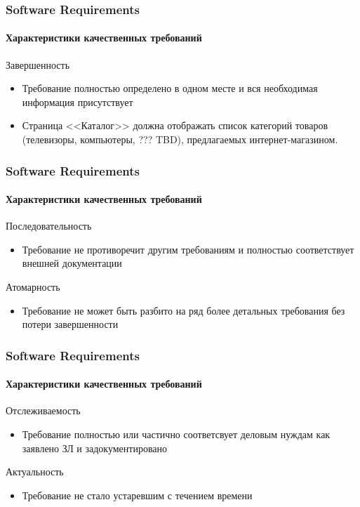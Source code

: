 \documentclass[aspectratio=169, 12pt]{beamer}
\begin{document}
\begin{frame}[t]
    \frametitle{Software Requirements}
    \framesubtitle{Характеристики качественных требований}
    Завершенность \newline
    \begin{itemize}
        \item Требование полностью определено в одном месте и вся необходимая информация присутствует \newline \pause
        \item Страница <<Каталог>> должна отображать список категорий товаров (телевизоры, компьютеры, ??? TBD),
              предлагаемых интернет-магазином.
    \end{itemize}
\end{frame}

\begin{frame}[t]
    \frametitle{Software Requirements}
    \framesubtitle{Характеристики качественных требований}
    Последовательность \newline
    \begin{itemize}
        \item Требование не противоречит другим требованиям и полностью соответствует внешней документации \newline \pause
    \end{itemize}
    Атомарность \newline
    \begin{itemize}
        \item Требование не может быть разбито на ряд более детальных требования без потери завершенности
    \end{itemize}
\end{frame}

\begin{frame}[t]
    \frametitle{Software Requirements}
    \framesubtitle{Характеристики качественных требований}
    Отслеживаемость \newline
    \begin{itemize}
        \item Требование полностью или частично соответсвует деловым нуждам как заявлено ЗЛ и задокументировано \newline \pause
    \end{itemize}
    Актуальность \newline
    \begin{itemize}
        \item Требование не стало устаревшим с течением времени
    \end{itemize}
\end{frame}
\end{document}
